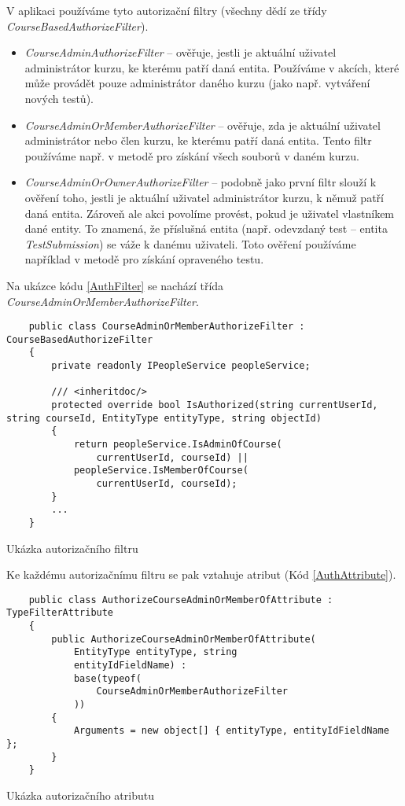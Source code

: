 V aplikaci používáme tyto autorizační filtry (všechny dědí ze třídy \textit{CourseBasedAuthorizeFilter}).
\begin{itemize}
	\item \textit{CourseAdminAuthorizeFilter} -- ověřuje, jestli je aktuální uživatel administrátor kurzu, ke kterému patří daná entita. Používáme v akcích, které může provádět pouze administrátor daného kurzu (jako např. vytváření nových testů).
	\item \textit{CourseAdminOrMemberAuthorizeFilter} -- ověřuje, zda je aktuální uživatel administrátor nebo člen kurzu, ke kterému patří daná entita. Tento filtr používáme např. v metodě pro získání všech souborů v daném kurzu.
	\item \textit{CourseAdminOrOwnerAuthorizeFilter} -- podobně jako první filtr slouží k ověření toho, jestli je aktuální uživatel administrátor kurzu, k němuž patří daná entita. Zároveň ale akci povolíme provést, pokud je uživatel vlastníkem dané entity. To znamená, že příslušná entita (např. odevzdaný test -- entita \textit{TestSubmission}) se váže k danému uživateli. Toto ověření používáme například v metodě pro získání opraveného testu.
\end{itemize}

Na ukázce kódu \ref{AuthFilter} se nachází třída \textit{CourseAdminOrMemberAuthorizeFilter}.

\begin{program}
	\begin{lstlisting}
	public class CourseAdminOrMemberAuthorizeFilter : CourseBasedAuthorizeFilter
	{
		private readonly IPeopleService peopleService;
		
		/// <inheritdoc/>
		protected override bool IsAuthorized(string currentUserId, string courseId, EntityType entityType, string objectId)
		{
			return peopleService.IsAdminOfCourse(
				currentUserId, courseId) || 
			peopleService.IsMemberOfCourse(
				currentUserId, courseId);
		}
		...
	}
	\end{lstlisting}
	\caption{Ukázka autorizačního filtru}
	\label{AuthFilter}
\end{program}

Ke každému autorizačnímu filtru se pak vztahuje atribut (Kód \ref{AuthAttribute}).

\begin{program}
	\begin{lstlisting}
	public class AuthorizeCourseAdminOrMemberOfAttribute : TypeFilterAttribute
	{
		public AuthorizeCourseAdminOrMemberOfAttribute(
			EntityType entityType, string 
			entityIdFieldName) : 
			base(typeof(
				CourseAdminOrMemberAuthorizeFilter
			))
		{
			Arguments = new object[] { entityType, entityIdFieldName };
		}
	}
	\end{lstlisting}
	\caption{Ukázka autorizačního atributu}
	\label{AuthAttribute}
\end{program}

